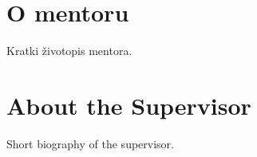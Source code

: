 \thispagestyle{empty}


\section*{O mentoru}


Kratki životopis mentora.


\section*{About the Supervisor}


Short biography of the supervisor.
